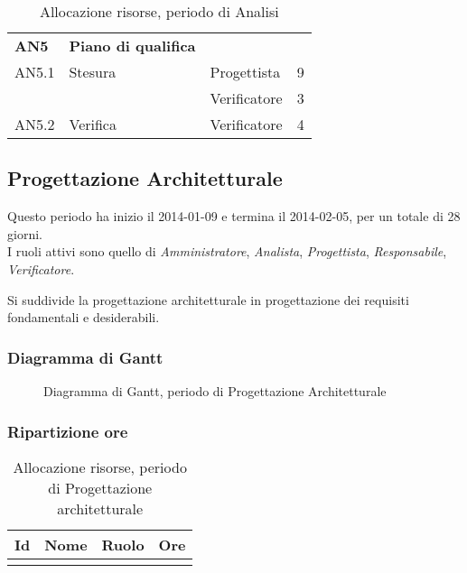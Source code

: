 \begin{table}[H]
\begin{tabular}{ l l l c  }
	\hline
	\textbf{AN5} & \textbf{Piano di qualifica} \\
	\cline{3-4}
	AN5.1 & Stesura & Progettista& 9\\ 
    & & Verificatore & 3 \\
    \cline{3-4}
	AN5.2 & Verifica & Verificatore &  4\\
	
	\hline
	\end{tabular}
	\caption{Allocazione risorse, periodo di Analisi}
	\end{table}

	
	\subsection{Progettazione Architetturale}
	
Questo periodo ha inizio il 2014-01-09 e termina il 2014-02-05, per un totale di 28 giorni. \\
I ruoli attivi sono quello di \textit{Amministratore}, \textit{Analista}, \textit{Progettista}, \textit{Responsabile}, \textit{Verificatore}.

Si suddivide la progettazione architetturale in progettazione dei requisiti fondamentali e desiderabili.

\subsubsection{Diagramma di Gantt}

\begin{figure}[H]
\centering
\scalebox{0.65}{%

	

}
\caption{Diagramma di Gantt, periodo di Progettazione Architetturale}
\end{figure}
	
\subsubsection{Ripartizione ore}
	\begin{center}
	\begin{longtable}{ l l l c  }%
	\hline
	\multicolumn{1}{c}{\textbf{Id}} & 
	\multicolumn{1}{c}{\textbf{Nome}} & 
	\multicolumn{1}{c}{\textbf{Ruolo}}& 
	\multicolumn{1}{c}{\textbf{Ore}} \\
	\hline
	
		
	
	\caption{Allocazione risorse, periodo di Progettazione architetturale}
	\end{longtable}
	\end{center}	
